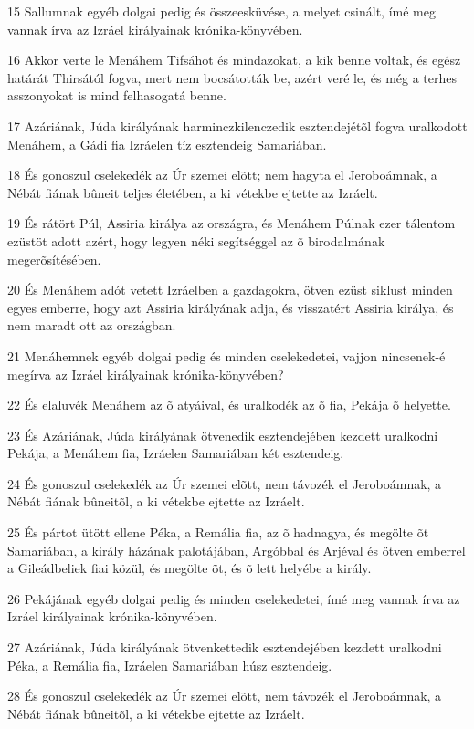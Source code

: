 \par 15 Sallumnak egyéb dolgai pedig és összeesküvése, a melyet csinált, ímé meg vannak írva az Izráel királyainak krónika-könyvében.
\par 16 Akkor verte le Menáhem Tifsáhot és mindazokat, a kik benne voltak, és egész határát Thirsától fogva, mert nem bocsátották be, azért veré le, és még a terhes asszonyokat is mind felhasogatá benne.
\par 17 Azáriának, Júda királyának harminczkilenczedik esztendejétõl fogva uralkodott Menáhem, a Gádi fia Izráelen tíz esztendeig Samariában.
\par 18 És gonoszul cselekedék az Úr szemei elõtt; nem hagyta el Jeroboámnak, a Nébát fiának bûneit teljes életében, a ki vétekbe ejtette az Izráelt.
\par 19 És rátört Púl, Assiria királya az országra, és Menáhem Púlnak ezer tálentom ezüstöt adott azért, hogy legyen néki segítséggel az õ birodalmának megerõsítésében.
\par 20 És Menáhem adót vetett Izráelben a gazdagokra, ötven ezüst siklust minden egyes emberre, hogy azt Assiria királyának adja, és visszatért Assiria királya, és nem maradt ott az országban.
\par 21 Menáhemnek egyéb dolgai pedig és minden cselekedetei, vajjon nincsenek-é megírva az Izráel királyainak krónika-könyvében?
\par 22 És elaluvék Menáhem az õ atyáival, és uralkodék az õ fia, Pekája õ helyette.
\par 23 És Azáriának, Júda királyának ötvenedik esztendejében kezdett uralkodni Pekája, a Menáhem fia, Izráelen Samariában két esztendeig.
\par 24 És gonoszul cselekedék az Úr szemei elõtt, nem távozék el Jeroboámnak, a Nébát fiának bûneitõl, a ki vétekbe ejtette az Izráelt.
\par 25 És pártot ütött ellene Péka, a Remália fia, az õ hadnagya, és megölte õt Samariában, a király házának palotájában, Argóbbal és Arjéval és ötven emberrel a Gileádbeliek fiai közül, és megölte õt, és õ lett helyébe a király.
\par 26 Pekájának egyéb dolgai pedig és minden cselekedetei, ímé meg vannak írva az Izráel királyainak krónika-könyvében.
\par 27 Azáriának, Júda királyának ötvenkettedik esztendejében kezdett uralkodni Péka, a Remália fia, Izráelen Samariában húsz esztendeig.
\par 28 És gonoszul cselekedék az Úr szemei elõtt, nem távozék el Jeroboámnak, a Nébát fiának bûneitõl, a ki vétekbe ejtette az Izráelt.
